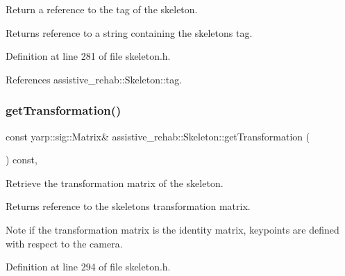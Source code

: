 Return a reference to the tag of the skeleton. 

\begin{DoxyReturn}{Returns}
reference to a string containing the skeleton\textquotesingle{}s tag. 
\end{DoxyReturn}


Definition at line 281 of file skeleton.\+h.


\begin{DoxyCode}{0}

\end{DoxyCode}


References assistive\+\_\+rehab\+::\+Skeleton\+::tag.

\mbox{\label{classassistive__rehab_1_1Skeleton_a2bdcc0d686a5a232aa2c07528cf2e647}} 
\subsubsection{\texorpdfstring{getTransformation()}{getTransformation()}}
{\footnotesize\ttfamily const yarp\+::sig\+::\+Matrix\& assistive\+\_\+rehab\+::\+Skeleton\+::get\+Transformation (\begin{DoxyParamCaption}{ }\end{DoxyParamCaption}) const\hspace{0.3cm}{\ttfamily [inline]}, {\ttfamily [inherited]}}



Retrieve the transformation matrix of the skeleton. 

\begin{DoxyReturn}{Returns}
reference to the skeleton\textquotesingle{}s transformation matrix. 
\end{DoxyReturn}
\begin{DoxyNote}{Note}
if the transformation matrix is the identity matrix, keypoints are defined with respect to the camera. 
\end{DoxyNote}


Definition at line 294 of file skeleton.\+h.


\begin{DoxyCode}{0}

\end{DoxyCode}


